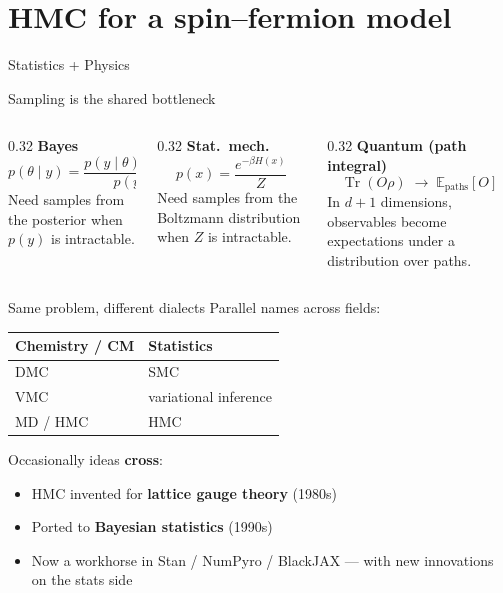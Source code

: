 \section{HMC for a spin--fermion model}
\renewcommand{\currentEdge}{stats-physics}

\begin{frame}{Statistics + Physics}
  \begin{center}
  \end{center}
\end{frame}

\begin{frame}{Sampling is the shared bottleneck}
  \begin{columns}[T]
    \begin{column}{0.32\textwidth}
      \textbf{Bayes}
      \[
        p(\theta\mid y)
        =
        \frac{p(y\mid\theta)\,p(\theta)}{p(y)}
      \]
      {\small Need samples from the posterior when $p(y)$ is intractable.}
    \end{column}
    \begin{column}{0.32\textwidth}
      \textbf{Stat.~mech.}
      \[
        p(x)
        =
        \frac{e^{-\beta H(x)}}{Z}
      \]
      {\small Need samples from the Boltzmann distribution when $Z$ is intractable.}
    \end{column}
    \begin{column}{0.32\textwidth}
      \textbf{Quantum (path integral)}
      \[
        \operatorname{Tr}(O\rho)
        \;\longrightarrow\;
        \mathbb{E}_{\mathrm{paths}}[O]
      \]
      {\small In $d{+}1$ dimensions, observables become expectations under a distribution over paths.}
    \end{column}
  \end{columns}
\end{frame}

\begin{frame}{Same problem, different dialects}
  Parallel names across fields:
  \begin{center}
    \begin{tabular}{ll}
      \toprule
      Chemistry / CM & Statistics \\
      \midrule
      DMC & SMC \\
      VMC & variational inference \\
      MD / HMC & HMC \\
      \bottomrule
    \end{tabular}
  \end{center}
  \vspace{0.5em}
  Occasionally ideas \textbf{cross}:
  \begin{itemize}
    \item HMC invented for \textbf{lattice gauge theory} (1980s)
    \item Ported to \textbf{Bayesian statistics} (1990s)
    \item Now a workhorse in Stan / NumPyro / BlackJAX --- with new innovations on the stats side
  \end{itemize}
\end{frame}

